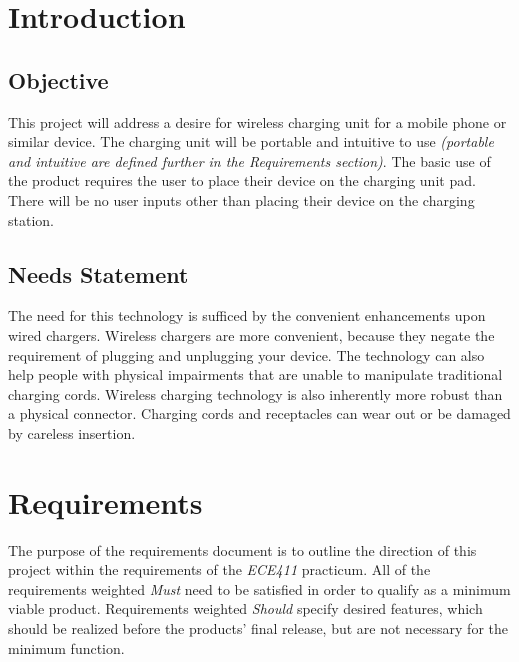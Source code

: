 


\section{Introduction}

    \subsection{Objective}
    This project will address a desire for wireless charging unit for a mobile phone or similar device. The charging unit will be portable and intuitive to use \textit{(portable and intuitive are defined further in the Requirements section)}. The basic use of the product requires the user to place their device on the charging unit pad. There will be no user inputs other than placing their device on the charging station.

    \subsection{Needs Statement}
     The need for this technology is sufficed by the convenient enhancements upon wired chargers. Wireless chargers are more convenient, because they negate the requirement of plugging and unplugging your device. The technology can also help people with physical impairments that are unable to manipulate traditional charging cords.
     Wireless charging technology is also inherently more robust than a physical connector. Charging cords and receptacles can wear out or be damaged by careless insertion.


\section{Requirements}

The purpose of the requirements document is to outline the direction of this project within the requirements of the \textit{ECE411} practicum. All of the requirements weighted \textit{Must} need to be satisfied in order to qualify as a minimum viable product. Requirements weighted \textit{Should} specify desired features, which should be realized before the products' final release, but are not necessary for the minimum function.

